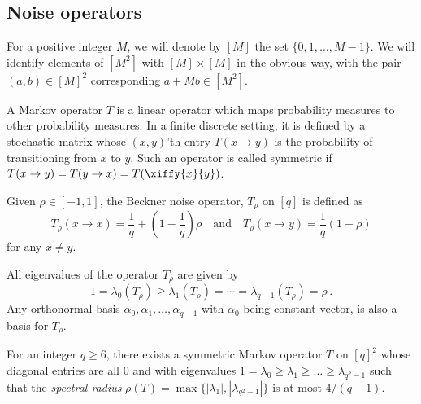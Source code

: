 \subsection{Noise  operators}
%
%
%
%
%
For a positive integer $M$, we will denote by $[M]$ the set
$\{0,1,\dots,M-1\}$.  We will identify elements of $[M^2]$ with $[M]
\times [M]$ in the obvious way, with the pair $(a,b) \in [M]^2$
corresponding $a + M b \in [M^2]$. 
%
%
\begin{definition}
  \label{def:markovop}
  A Markov operator $T$ is a linear operator which maps probability
  measures to other probability measures. In a finite discrete
  setting, it is defined by a stochastic matrix whose $(x,y)$'th entry
  $T(x \rightarrow y)$ is the probability of transitioning from $x$ to
  $y$. Such an operator is called symmetric if $T(x \rightarrow y) =
  T(y \rightarrow x) = T(\xiffy{x}{y})$.
\end{definition}
\begin{definition}
  \label{def:beckner}
  Given $\rho\in [-1,1]$, the Beckner noise operator, $T_{\rho}$ on
  $[q]$ is defined as \[
  T_\rho(x\rightarrow x) = \frac{1}{q} +
  \left(1-\frac{1}{q}\right) \rho\quad \text{and}\quad T_\rho(x\rightarrow y) =
  \frac{1}{q}(1-\rho)\] for any $x\neq y$. 
\end{definition}
%
\begin{observation}\label{obs:basis-id}
  All eigenvalues of the operator $T_{\rho}$ are given by \[1 =
  \lambda_0(T_\rho)\ge \lambda_1(T_\rho) = \cdots =
  \lambda_{q-1}(T_\rho) = \rho\,.\] Any orthonormal basis
  $\alpha_0,\alpha_1,\ldots,\alpha_{q-1}$ with $\alpha_0$ being
  constant vector, is also a basis for $T_{\rho}$.
\end{observation}
%
\begin{lemma}
  \label{lemma:T}
  For an integer $q \ge 6$, there exists a symmetric Markov operator
  $T$ on $[q]^2$ whose diagonal entries are all $0$ and with
  eigenvalues $1=\lambda_0\ge \lambda_1\ge \ldots\ge \lambda_{q^2-1}$
  such that the \emph{spectral radius} $\rho(T) =
  \max\{|\lambda_1|,|\lambda_{q^2-1}|\}$ is at most
  ${4}/{(q-1)}$.%
\end{lemma}
